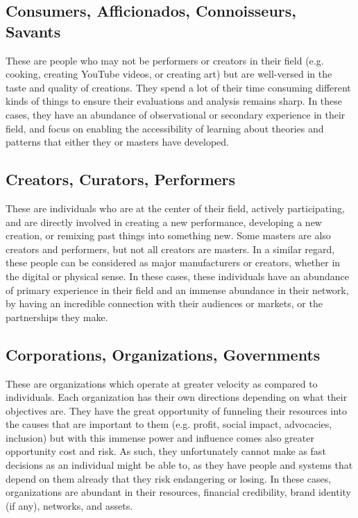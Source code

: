 \documentclass[journal, onecolumn]{IEEEtran}
\begin{document}
\subsection{Consumers, Afficionados, Connoisseurs, Savants}

These are people who may not be performers or creators in their field (e.g. cooking,
creating YouTube videos, or creating art) but are well-versed in the taste and 
quality of creations. They spend a lot of their time consuming different kinds of
things to ensure their evaluations and analysis remains sharp. In these cases, 
they have an abundance of observational or secondary experience in their field,
and focus on enabling the accessibility of learning about theories and patterns 
that either they or masters have developed.

\subsection{Creators, Curators, Performers}

These are individuals who are at the center of their field, actively participating,
and are directly involved in creating a new performance, developing a new creation, 
or remixing past things into something new. Some masters are also creators and 
performers, but not all creators are masters. In a similar regard, these people can
be considered as major manufacturers or creators, whether in the digital or physical 
sense. In these cases, these individuals have an abundance of primary experience in
their field and an immense abundance in their network, by having an incredible
connection with their audiences or markets, or the partnerships they make.

\subsection{Corporations, Organizations, Governments}

These are organizations which operate at greater velocity as compared to individuals.
Each organization has their own directions depending on what their objectives are.
They have the great opportunity of funneling their resources into the causes that
are important to them (e.g. profit, social impact, advocacies, inclusion) but with
this immense power and influence comes also greater opportunity cost and risk. As
such, they unfortunately cannot make as fast decisions as an individual might be 
able to, as they have people and systems that depend on them already that they risk
endangering or losing. In these cases, organizations are abundant in their resources,
financial credibility, brand identity (if any), networks, and assets.
\end{document}
